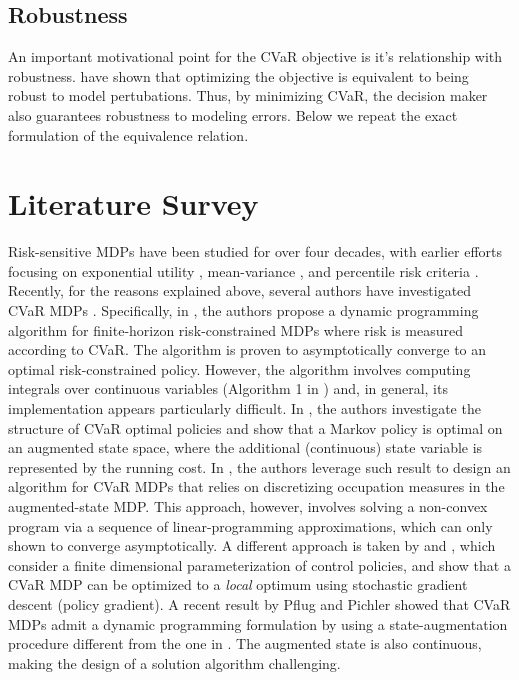 \subsection{Robustness}

An important motivational point for the CVaR objective  is it's relationship with robustness. \citet{chow2015risk} have shown that optimizing the objective is equivalent to being robust to model pertubations. Thus, by minimizing CVaR, the decision maker also guarantees robustness to modeling errors. Below we repeat the exact formulation of the equivalence relation.




\section{Literature Survey}\label{sec:prelim:literature}


Risk-sensitive MDPs have been studied for over four decades, with earlier efforts focusing on exponential utility \cite{Howard1972Risk}, mean-variance \cite{sobel_variance_1982}, and percentile risk criteria \cite{filar_percentile_1995} . Recently, for the reasons explained above, several authors have investigated CVaR MDPs \cite{rockafellar2000optimization}. Specifically, in \cite{borkar2014risk}, the authors propose a dynamic programming algorithm for finite-horizon risk-constrained MDPs where risk is measured according to CVaR. The algorithm is proven to asymptotically converge to an optimal risk-constrained policy. However, the algorithm involves computing  integrals over continuous variables (Algorithm 1 in \cite{borkar2014risk}) and, in general, its implementation appears particularly difficult. In \cite{bauerle2011markov}, the authors investigate the structure of CVaR optimal policies and show that a Markov policy is optimal on an augmented state space, where the additional (continuous) state variable is represented  by the running cost. In   \cite{haskell2014convex}, the authors leverage such result to design an algorithm for CVaR MDPs that relies on discretizing occupation measures in the augmented-state MDP. This approach, however, involves solving a non-convex program via a sequence of linear-programming approximations, which can only shown to converge asymptotically. A different approach is taken by \cite{chow2014cvar} and \cite{tamar2015optimizing}, which consider a finite dimensional parameterization of control  policies, and show that a CVaR MDP can be optimized to a \emph{local} optimum using stochastic gradient descent (policy gradient). A recent result by Pflug and Pichler \cite{pflug2012time} showed that CVaR MDPs admit a dynamic programming formulation by using a state-augmentation procedure different from the one in \cite{bauerle2011markov}. The augmented state  is also continuous, making the design of a solution algorithm challenging. 

